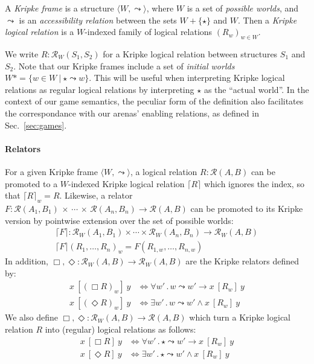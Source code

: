 \documentclass[acmsmall,anonymous]{acmart}
\newcommand{\ifr}[1]{\ [{#1}]\ }
\begin{document}
\begin{definition}
A \emph{Kripke frame} is a structure $\langle W, \leadsto \rangle$, where
$W$ is a set of \emph{possible worlds}, and
$\leadsto$ is an \emph{accessibility relation}
between the sets $W + \{\star\}$ and $W$.
Then a \emph{Kripke logical relation} is
a $W$-indexed family of logical relations $(R_w)_{w \in W}$.
\end{definition}

We write $R : \mathcal{R}_W(S_1, S_2)$
for a Kripke logical relation between structures $S_1$ and $S_2$.
Note that our Kripke frames
include a set of \emph{initial worlds}
$W* = \{ w \in W \ |\  \star \leadsto w \}$.
This will be useful when interpreting Kripke logical relations
as regular logical relations
by interpreting $\star$ as the ``actual world''.
In the context of our game semantics,
the peculiar form of the definition
also facilitates the correspondance with
our arenas' enabling relations,
as defined in Sec.~\ref{sec:games}.

\paragraph{Relators}

For a given Kripke frame $\langle W, \leadsto \rangle$,
a logical relation $R : \mathcal{R}(A, B)$
can be promoted to a $W$-indexed Kripke logical relation $\lceil R \rceil$
which ignores the index, so that $\lceil R \rceil_w = R$.
Likewise,
a relator
  $F : \mathcal{R}(A_1, B_1) \,\times\,\cdots\,\times\,\mathcal{R}(A_n, B_n) \rightarrow \mathcal{R}(A, B)$
can be promoted to its Kripke version
by pointwise extension over the set of possible worlds:
\begin{gather*}
  \lceil F \rceil : \mathcal{R}_W(A_1, B_1) \times \cdots \times \mathcal{R}_W(A_n, B_n) \rightarrow \mathcal{R}_W(A, B) \\
  \lceil F \rceil (R_1, \ldots, R_n)_w = F(R_{1,w}, \ldots, R_{n,w})
\end{gather*}
In addition,
$\Box, \Diamond : \mathcal{R}_W(A,B) \rightarrow \mathcal{R}_W(A,B)$
are the Kripke relators defined by:
\begin{align*}
  x \ifr{(\Box R)_w} y &\Leftrightarrow
    \forall w' \,.\, w \leadsto w' \rightarrow x \ifr{R_w} y \\
  x \ifr{(\Diamond R)_w} y &\Leftrightarrow
    \exists w' \,.\, w \leadsto w' \wedge x \ifr{R_w} y
\end{align*}
We also define
$\Box, \Diamond : \mathcal{R}_W(A,B) \rightarrow \mathcal{R}(A,B)$
which turn a Kripke logical relation $R$
into (regular) logical relations as follows:
\begin{align*}
  x \ifr{\Box R} y &\Leftrightarrow
    \forall w' \,.\, \star \leadsto w' \rightarrow x \ifr{R_w} y \\
  x \ifr{\Diamond R} y &\Leftrightarrow
    \exists w' \,.\, \star \leadsto w' \wedge x \ifr{R_w} y
\end{align*}
\end{document}
